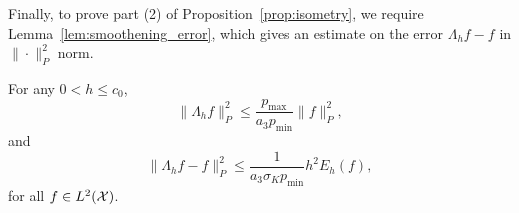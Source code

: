 Finally, to prove part (2) of Proposition~\ref{prop:isometry}, we require Lemma~\ref{lem:smoothening_error}, which gives an estimate on the error $\Lambda_h f - f$ in $\|\cdot\|_P^2$ norm.
\begin{lemma}
	\label{lem:smoothening_error}
	For any $0 < h \leq c_0$, 
	\begin{equation}
	\label{eqn:smoothening_error_norm}
	\bigl\|\Lambda_hf\bigr\|_{P}^2 \leq \frac{p_{\max}}{a_3p_{\min}} \bigl\|f\bigr\|_{P}^2,
	\end{equation}
	and
	\begin{equation}
	\label{eqn:smoothening_error_energy}
	\bigl\|\Lambda_hf - f\bigr\|_{P}^2 \leq \frac{1}{a_3\sigma_Kp_{\min}} h^2 E_h(f),
	\end{equation}
	for all $f \in L^2(\mathcal{X})$.
\end{lemma}

